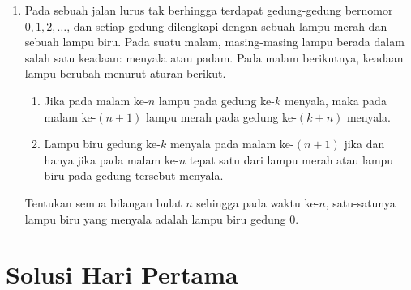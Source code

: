 \documentclass[12pt]{article}
\begin{document}
\begin{enumerate}
  \item Pada sebuah jalan lurus tak berhingga terdapat gedung-gedung bernomor $0,1,2,\dots$, dan setiap gedung dilengkapi dengan sebuah lampu merah dan sebuah lampu biru. Pada suatu malam, masing-masing lampu berada dalam salah satu keadaan: menyala atau padam. Pada malam berikutnya, keadaan lampu berubah menurut aturan berikut.
        \begin{enumerate}
          \item Jika pada malam ke-$n$ lampu pada gedung ke-$k$ menyala, maka pada malam ke-$(n+1)$ lampu merah pada gedung ke-$(k+n)$ menyala.
          \item Lampu biru gedung ke-$k$ menyala pada malam ke-$(n+1)$ jika dan hanya jika pada malam ke-$n$ tepat satu dari lampu merah atau lampu biru pada gedung tersebut menyala.
        \end{enumerate}
        Tentukan semua bilangan bulat $n$ sehingga pada waktu ke-$n$, satu-satunya lampu biru yang menyala adalah lampu biru gedung $0$.

\end{enumerate}

\newpage

\section*{Solusi Hari Pertama}
\end{document}
